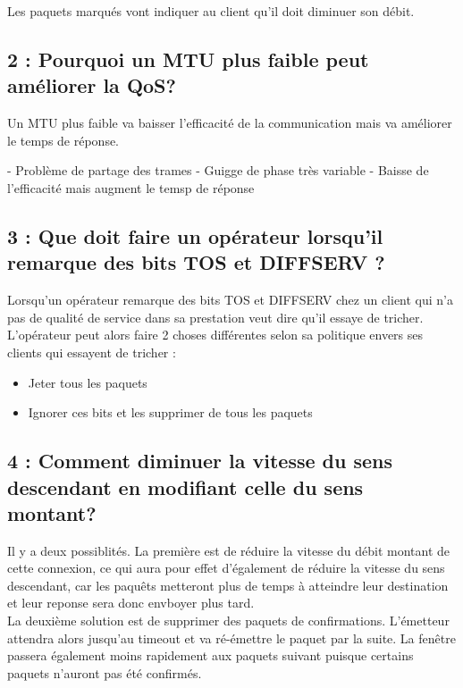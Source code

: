 \documentclass{article}
\begin{document}
Les paquets marqués vont indiquer au client qu'il doit diminuer son débit.

\subsection*{2 : Pourquoi un MTU plus faible peut améliorer la QoS?}

Un MTU plus faible va baisser l'efficacité de la communication mais va améliorer le temps de réponse.

- Problème de partage des trames
- Guigge de phase très variable
- Baisse de l'efficacité mais augment le temsp de réponse

\subsection*{3 : Que doit faire un opérateur lorsqu'il remarque des bits TOS et DIFFSERV ?}

Lorsqu'un opérateur remarque des bits TOS \cite{ToS} et DIFFSERV \cite{DiffServ} chez un client qui n'a pas de qualité de service dans sa prestation veut dire qu'il essaye de tricher.\\

L'opérateur peut alors faire 2 choses différentes selon sa politique envers ses clients qui essayent de tricher : 

\begin{itemize}
 	\item Jeter tous les paquets
 	\item Ignorer ces bits et les supprimer de tous les paquets
\end{itemize}

\subsection*{4 : Comment diminuer la vitesse du sens descendant en modifiant celle du sens montant?}

Il y a deux possiblités. La première est de réduire la vitesse du débit montant de cette connexion, ce qui aura pour effet d'également de réduire la vitesse du sens descendant, car les paquêts metteront plus de temps à atteindre leur destination et leur reponse sera donc envboyer plus tard.\\

La deuxième solution  est de supprimer des paquets de confirmations. L'émetteur attendra alors jusqu'au timeout et va ré-émettre le paquet par la suite. La fenêtre passera également moins rapidement aux paquets suivant puisque certains paquets n'auront pas été confirmés.
\end{document}
